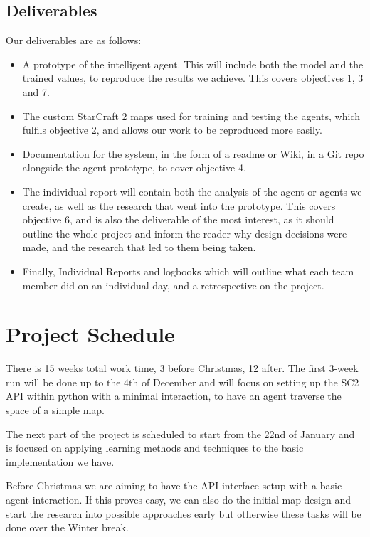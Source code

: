 \documentclass[12pt]{article}
\begin{document}
\subsection{Deliverables}
Our deliverables are as follows:
\begin{itemize}
    \item A prototype of the intelligent agent.
          This will include both the model and the trained values,
          to reproduce the results we achieve. This covers objectives 1, 3 and 7.
    \item The custom StarCraft 2 maps used for training and testing the agents,
          which fulfils objective 2, and allows our work to be reproduced more easily.
    \item Documentation for the system, in the form of a readme or Wiki,
          in a Git repo alongside the agent prototype, to cover objective 4.
    \item The individual report will contain both the analysis of the agent or
          agents we create, as well as the research that went into the prototype.
          This covers objective 6, and is also the deliverable of the most interest,
          as it should outline the whole project and inform the reader why design
          decisions were made, and the research that led to them being taken.
    \item Finally, Individual Reports and logbooks which will outline what each
          team member did on an individual day, and a retrospective on the project.
\end{itemize}


\section{Project Schedule}

There is 15 weeks total work time, 3 before Christmas, 12 after.
The first 3-week run will be done up to the 4th of December and will focus
on setting up the SC2 API within python with a minimal interaction, to
have an agent traverse the space of a simple map.

The next part of the project is scheduled to start from the 22nd of
January and is focused on applying learning methods and techniques
to the basic implementation we have.

Before Christmas we are aiming to have the API interface setup with
a basic agent interaction. If this proves easy, we can also do the
initial map design and start the research into possible approaches early
but otherwise these tasks will be done over the Winter break.
\end{document}
